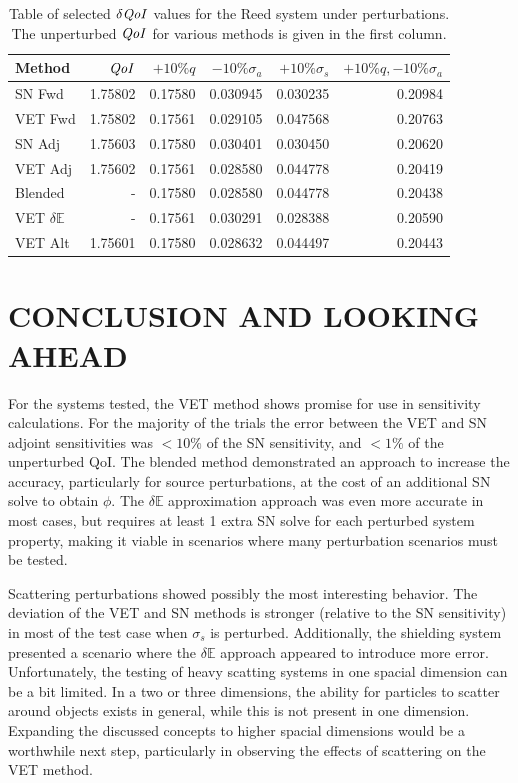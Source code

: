 \documentclass[12pt]{report}
\newcommand{\Edd}{\mathbb{E}}
\newcommand{\sigs}{\sigma_s}
\newcommand{\siga}{\sigma_a}
\newcommand{\qoi}{{\it QoI}\xspace}
\begin{document}
\begin{table}[H]
\centering
  \begin{tabular}{| l | r || r | r | r | r |}
    \hline
    Method  & $\qoi$ & $+10\% q $  & $-10\% \siga $ & $+10\% \sigs $ & $+10\% q,-10\% \siga$ \\ \hline
     SN Fwd 			&1.75802 	&0.17580 &0.030945 &0.030235 & 0.20984\\ \hline
     VET Fwd 			&1.75802 	&0.17561 &0.029105 &0.047568 &0.20763\\ \hline
     SN Adj 			&1.75603  	&0.17580 &0.030401 &0.030450 &0.20620\\ \hline
     VET Adj 			&1.75602  	&0.17561 &0.028580 &0.044778 &0.20419\\ \hline
     Blended 			&-	 		&0.17580 &0.028580 &0.044778 &0.20438\\ \hline
     VET $\delta \Edd$ 	&-		 	&0.17561 &0.030291 &0.028388 &0.20590\\ \hline
     VET Alt		 	&1.75601 	&0.17580 &0.028632 &0.044497 &0.20443\\ \hline
    \end{tabular}
  \caption{Table of selected $\delta \qoi$ values for the Reed system under perturbations. The unperturbed $\qoi$ for various methods is given in the first column.}
\end{table}

\chapter{\uppercase {Conclusion and looking ahead}}

For the systems tested, the VET method shows promise for use in sensitivity calculations. For the majority of the trials the error between the VET and SN adjoint sensitivities was $<10\%$ of the SN sensitivity, and $<1\%$ of the unperturbed QoI. The blended method demonstrated an approach to increase the accuracy, particularly for source perturbations, at the cost of an additional SN solve to obtain $\phi$. The $\delta \Edd$ approximation approach was even more accurate in most cases, but requires at least 1 extra SN solve for each perturbed system property, making it viable in scenarios where many perturbation scenarios must be tested. 

Scattering perturbations showed possibly the most interesting behavior. The deviation of the VET and SN methods is stronger (relative to the SN sensitivity) in most of the test case when $\sigs$ is perturbed. Additionally, the shielding system presented a scenario where the $\delta \Edd$ approach appeared to introduce more error. Unfortunately, the testing of heavy scatting systems in one spacial dimension can be a bit limited. In a two or three dimensions, the ability for particles to scatter around objects exists in general, while this is not present in one dimension. Expanding the discussed concepts to higher spacial dimensions would be a worthwhile next step, particularly in observing the effects of scattering on the VET method.
\end{document}

